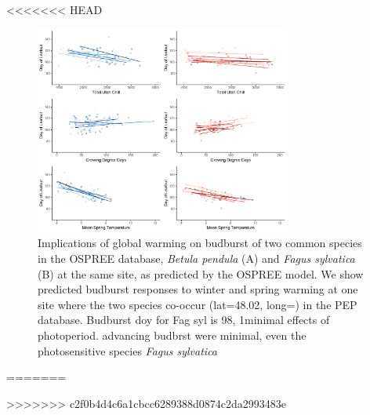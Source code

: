 \documentclass{article}
\begin{document}
<<<<<<< HEAD
\newpage
\begin{figure}[h!]
\centering
\noindent \includegraphics[width=0.75\textwidth]{..//..//analyses/bb_analysis/PEP_climate/figures/betpen_multruns_utahgddmat.pdf}
\caption{Implications of global warming on budburst of two common species in the OSPREE database, \emph{Betula pendula} (A) and \emph{Fagus sylvatica} (B) at the same site, as predicted by the OSPREE model. We show predicted budburst responses to winter and spring warming at one site where the two species co-occur (lat=48.02, long=) in the PEP database. Budburst doy for Fag syl is 98, 1minimal effects of photoperiod. advancing budbrst were minimal, even the photosensitive species \emph{Fagus sylvatica}}
\label{fig:pep}
\end{figure}
=======

>>>>>>> c2f0b4d4c6a1cbcc6289388d0874c2da2993483e









\end{document}
